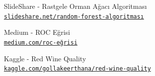 \documentclass[conference]{IEEEtran}
\begin{document}
\begin{thebibliography}{23}
SlideShare - Rastgele Orman Ağacı Algoritması
\\\texttt{\href{https://www.slideshare.net/SezerFidanc/random-forest-algoritmas}{\nolinkurl{slideshare.net/random-forest-algoritması}}}

Medium - ROC Eğrisi
\\\texttt{\href{https://bernatas.medium.com/roc-eğrisi-ve-eğri-altında-kalan-alan-auc-97b058e8e0cf}{\nolinkurl{medium.com/roc-eğrisi}}}

Kaggle - Red Wine Quality
\\\texttt{\href{https://www.kaggle.com/gollakeerthana/red-wine-quality-lr-rf-93}{\nolinkurl{kaggle.com/gollakeerthana/red-wine-quality}}}



\end{thebibliography}
\end{document}
